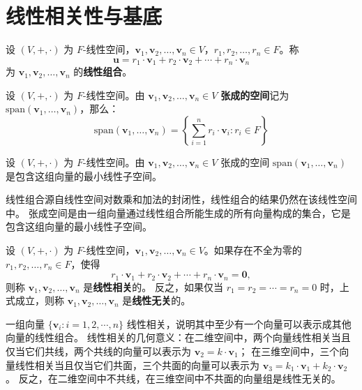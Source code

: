 \section{线性相关性与基底}

\begin{definition}[线性组合]
    设 $ (V,+,\cdot) $ 为 $ F $-线性空间，$ \mathbf{v}_1,\mathbf{v}_2,\ldots,\mathbf{v}_n\in V $，$ r_1,r_2,\ldots,r_n\in F $。称
    \[
        \mathbf{u} = r_1\cdot \mathbf{v}_1 + r_2\cdot \mathbf{v}_2 + \cdots + r_n\cdot \mathbf{v}_n
    \]
    为 $ \mathbf{v}_1,\mathbf{v}_2,\ldots,\mathbf{v}_n $ 的\textbf{线性组合}。
\end{definition}

\begin{definition}
    设 $ (V,+,\cdot) $ 为 $ F $-线性空间。由 $ \mathbf{v}_1,\mathbf{v}_2,\ldots,\mathbf{v}_n\in V $ \textbf{张成的空间}记为 $\mathrm{span}(\mathbf{v}_1,\ldots,\mathbf{v}_n)$，那么：
    \[
        \mathrm{span}(\mathbf{v}_1,\ldots,\mathbf{v}_n) = \left\{ \sum_{i=1}^{n} r_i\cdot \mathbf{v}_i : r_i\in F \right\}
    \]
    \label{def:span}
\end{definition}
\begin{proposition}
    设 $ (V,+,\cdot) $ 为 $ F $-线性空间。由 $ \mathbf{v}_1,\mathbf{v}_2,\ldots,\mathbf{v}_n\in V $ 张成的空间 $\mathrm{span}(\mathbf{v}_1,\ldots,\mathbf{v}_n)$ 是包含这组向量的最小线性子空间。
\end{proposition}
\begin{note}
    线性组合源自线性空间对数乘和加法的封闭性，线性组合的结果仍然在该线性空间中。
    张成空间是由一组向量通过线性组合所能生成的所有向量构成的集合，它是包含这组向量的最小线性子空间。
\end{note}
\vspace{1em}

\begin{definition} 
    设 $ (V,+,\cdot) $ 为 $ F $-线性空间，$ \mathbf{v}_1,\mathbf{v}_2,\ldots,\mathbf{v}_n\in V $。如果存在不全为零的 $ r_1,r_2,\ldots,r_n\in F $，使得
    \[
        r_1\cdot \mathbf{v}_1 + r_2\cdot \mathbf{v}_2 + \cdots + r_n\cdot \mathbf{v}_n = \mathbf{0},
    \]
    则称 $ \mathbf{v}_1,\mathbf{v}_2,\ldots,\mathbf{v}_n $ 是\textbf{线性相关}的。
    反之，如果仅当 $ r_1=r_2=\cdots=r_n=0 $ 时，上式成立，则称 $ \mathbf{v}_1,\mathbf{v}_2,\ldots,\mathbf{v}_n $ 是\textbf{线性无关}的。
    \label{def:linear_dependence}
\end{definition}

\begin{note}
    一组向量 $\{\mathbf{v}_i:i=1,2,\cdots,n\}$ 线性相关，说明其中至少有一个向量可以表示成其他向量的线性组合。
    线性相关的几何意义：在二维空间中，两个向量线性相关当且仅当它们共线，两个共线的向量可以表示为 $\mathbf{v}_2=k\cdot \mathbf{v}_1$；
    在三维空间中，三个向量线性相关当且仅当它们共面，三个共面的向量可以表示为 $\mathbf{v}_3=k_1\cdot \mathbf{v}_1 + k_2\cdot \mathbf{v}_2$。
    反之，在二维空间中不共线，在三维空间中不共面的向量组是线性无关的。
\end{note}

